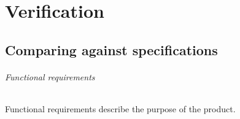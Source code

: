 \documentclass[11pt,fleqn,,a4paper,twoside,openright]{book}
\begin{document}
\part{Verification}\label{part:Verification}


\chapter{Comparing against specifications}\label{chap:CompareSpecification}

\paragraph{Functional requirements}
Functional requirements describe the purpose of the product.
\end{document}
